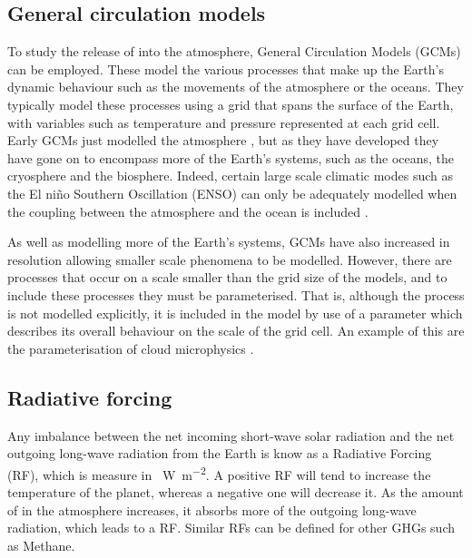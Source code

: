 \documentclass{article}
\begin{document}
\subsection{General circulation models}
To study the release of  into the atmosphere, General Circulation Models (GCMs) can be employed. These model the various processes that make up the Earth's dynamic behaviour such as the movements of the atmosphere or the oceans. They typically model these processes using a grid that spans the surface of the Earth, with variables such as temperature and pressure represented at each grid cell. Early GCMs just modelled the atmosphere \parencite{holloway1971simulation}, but as they have developed they have gone on to encompass more of the Earth's systems, such as the oceans, the cryosphere and the biosphere. Indeed, certain large scale climatic modes such as the El ni{\~n}o Southern Oscillation (ENSO) can only be adequately modelled when the coupling between the atmosphere and the ocean is included \parencite{neelin2011climate}. 

As well as modelling more of the Earth's systems, GCMs have also increased in resolution allowing smaller scale phenomena to be modelled. However, there are processes that occur on a scale smaller than the grid size of the models, and to include these processes they must be parameterised. That is, although the process is not modelled explicitly, it is included in the model by use of a parameter which describes its overall behaviour on the scale of the grid cell. An example of this are the parameterisation of cloud microphysics \parencite{walko1995new, neelin2011climate}.

\subsection{Radiative forcing}
Any imbalance between the net incoming short-wave solar radiation and the net outgoing long-wave radiation from the Earth is know as a Radiative Forcing (RF), which is measure in \SI{}{W.m^{-2}}. A positive RF will tend to increase the temperature of the planet, whereas a negative one will decrease it. As the amount of  in the atmosphere increases, it absorbs more of the outgoing long-wave radiation, which leads to a RF. Similar RFs can be defined for other GHGs such as Methane.

\end{document}
